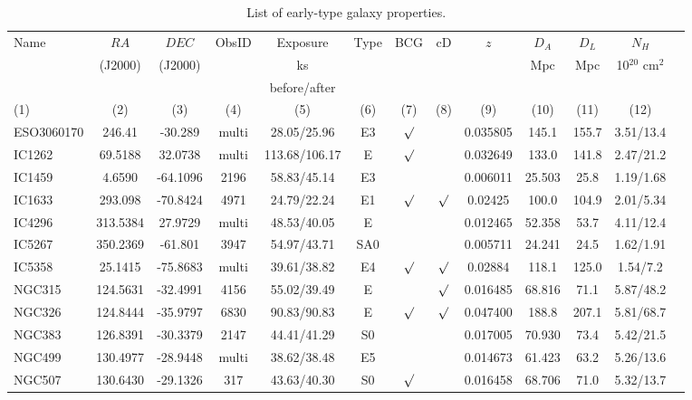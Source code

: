 \documentclass[iop]{emulateapj}
\begin{document}
\setcounter{table}{0}
\begin{table}
\centering
\caption{List of early-type galaxy properties.}\label{tab1}
\begin{tabular}{lcccccccccccc}
\hline
Name      & $RA$ & $DEC$ & ObsID & Exposure & Type & BCG & cD &  $z$     &  $D_A$ &  $D_L$  &  $N_{H}$ \\
          &  (J2000)   & (J2000)    &       &    ks        &      &    &     &          &   Mpc  &  Mpc    &  10$^{20}$ cm$^{2}$ \\
          &            &            &       & before/after &      &   &     &           &        &         &    \\
   (1)    &    (2)     &    (3)     &   (4) &     (5)      &  (6)  &  (7)  &  (8)   &   (9)  & (10)   &  (11) & (12) \\
\hline
ESO3060170 & 246.41 & -30.289 & multi  & 28.05/25.96  & E3 & $\surd$ & & 0.035805 & 145.1  & 155.7 & 3.51/13.4  \\
IC1262  & 69.5188 & 32.0738 & multi & 113.68/106.17 & E & $\surd$ & & 0.032649 & 133.0 & 141.8 & 2.47/21.2  \\
IC1459  & 4.6590 & -64.1096 & 2196 & 58.83/45.14 & E3 & && 0.006011&  25.503 & 25.8 & 1.19/1.68  \\
IC1633  & 293.098 & -70.8424 & 4971 & 24.79/22.24 & E1 & $\surd$ & $\surd$ & 0.02425 & 100.0 & 104.9 & 2.01/5.34 \\
IC4296  & 313.5384 & 27.9729 & multi & 48.53/40.05 & E & & & 0.012465 & 52.358 & 53.7 & 4.11/12.4    \\
IC5267  & 350.2369 & -61.801 & 3947 & 54.97/43.71 & SA0 & & & 0.005711 & 24.241 & 24.5 & 1.62/1.91  \\
IC5358  & 25.1415 & -75.8683 & multi & 39.61/38.82 & E4 & $\surd$ & $\surd$ & 0.02884 & 118.1 & 125.0 & 1.54/7.2 \\
NGC315  & 124.5631 & -32.4991 & 4156 & 55.02/39.49 & E &         & $\surd$ & 0.016485 & 68.816 & 71.1 & 5.87/48.2 \\
NGC326  & 124.8444 & -35.9797 & 6830 & 90.83/90.83 & E & $\surd$ & $\surd$ & 0.047400 & 188.8  & 207.1 &  5.81/68.7  \\
NGC383  & 126.8391 & -30.3379 & 2147  & 44.41/41.29  & S0 &         &  & 0.017005 & 70.930 & 73.4 & 5.42/21.5  \\
NGC499  & 130.4977 & -28.9448 & multi & 38.62/38.48 & E5 & & & 0.014673 & 61.423 & 63.2 & 5.26/13.6  \\
NGC507  & 130.6430 & -29.1326 & 317 & 43.63/40.30 & S0 & $\surd$ & & 0.016458 & 68.706 & 71.0 & 5.32/13.7  \\

\end{tabular}
\end{table}
\end{document}
